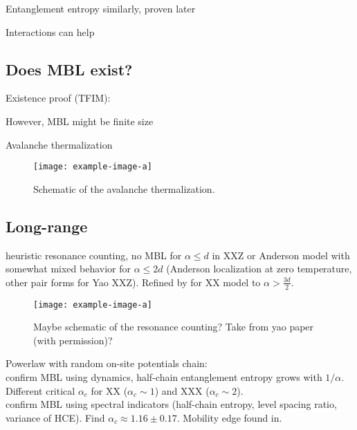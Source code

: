 Entanglement entropy similarly\cite{bardarsonUnboundedGrowthEntanglement2012}, proven later\cite{huangExtensiveEntropyUnitary2021}

Interactions can help\cite{huangInteractionenhancedManybodyLocalization2024}

\subsection{Does MBL exist?}
Existence proof (TFIM): \cite{imbrieManyBodyLocalizationQuantum2016}

However, MBL might be finite size

Avalanche thermalization

\begin{figure}[htb]
	\centering
	\texttt{[image: example-image-a]}
	\caption{Schematic of the avalanche thermalization.}
\end{figure}

\subsection{Long-range}

heuristic resonance counting, no MBL for $\alpha\leq d$ in XXZ \cite{yaoManyBodyLocalizationDipolar2014,burinManybodyDelocalizationStrongly2015,gutmanEnergyTransportAnderson2016} or Anderson model \cite{burinEnergyDelocalizationStrongly2006} with somewhat mixed behavior for $\alpha\leq 2d$ (Anderson localization at zero temperature, other pair forms for Yao XXZ). Refined by \cite{burinLocalizationRandomXY2015} for XX model to $\alpha > \frac{3d}{2}$.

\begin{figure}[htb]
	\centering
	\texttt{[image: example-image-a]}
	\caption{Maybe schematic of the resonance counting? Take from yao paper (with permission)?}
\end{figure}

Powerlaw with random on-site potentials chain:\\ \cite{safavi-nainiQuantumDynamicsDisordered2019} confirm MBL using dynamics, half-chain entanglement entropy grows with $1/\alpha$. Different critical $\alpha_c$ for XX ($\alpha_c\sim1$) and XXX ($\alpha_c\sim2$). \\
\cite{schifferManybodyLocalizationSpin2019} confirm MBL using spectral indicators (half-chain entropy, level spacing ratio, variance of HCE). Find $\alpha_c \approx 1.16\pm0.17$. Mobility edge found in\cite{yousefjaniMobilityEdgeLongrange2023}.

